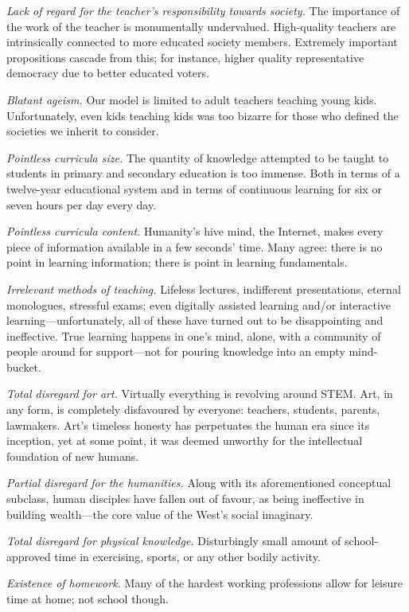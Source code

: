 \emph{Lack of regard for the teacher's responsibility towards society.} The importance of the work of the teacher is monumentally undervalued. High-quality teachers are intrinsically connected to more educated society members. Extremely important propositions cascade from this; for instance, higher quality representative democracy due to better educated voters.

\emph{Blatant ageism.} Our model is limited to adult teachers teaching young kids. Unfortunately, even kids teaching kids was too bizarre for those who defined the societies we inherit to consider.

\emph{Pointless curricula size.} The quantity of knowledge attempted to be taught to students in primary and secondary education is too immense. Both in terms of a twelve-year educational system and in terms of continuous learning for six or seven hours per day every day.

\emph{Pointless curricula content.} Humanity’s hive mind, the Internet, makes every piece of information available in a few seconds’ time. Many agree: there is no point in learning information; there is point in learning fundamentals.

\emph{Irrelevant methods of teaching.} Lifeless lectures, indifferent presentations, eternal monologues, stressful exams; even digitally assisted learning and/or interactive learning—unfortunately, all of these have turned out to be disappointing and ineffective. True learning happens in one’s mind, alone, with a community of people around for support—not for pouring knowledge into an empty mind-bucket.

\emph{Total disregard for art.} Virtually everything is revolving around STEM. Art, in any form, is completely disfavoured by everyone: teachers, students, parents, lawmakers. Art’s timeless honesty has perpetuates the human era since its inception, yet at some point, it was deemed unworthy for the intellectual foundation of new humans.

\emph{Partial disregard for the humanities.} Along with its aforementioned conceptual subclass, human disciples have fallen out of favour, as being ineffective in building wealth—the core value of the West’s social imaginary.

\emph{Total disregard for physical knowledge.} Disturbingly small amount of school-approved time in exercising, sports, or any other bodily activity.

\emph{Existence of homework.} Many of the hardest working professions allow for leisure time at home; not school though.

